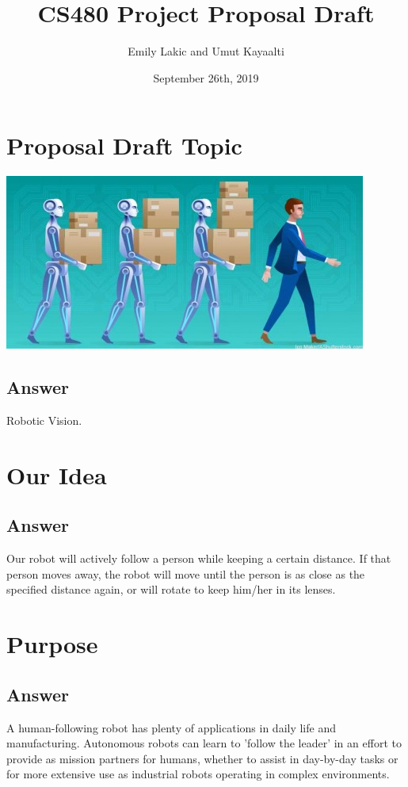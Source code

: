 \documentclass[
	12pt, %
]{fphw}
\title{CS480 Project Proposal Draft} %
\author{Emily Lakic and Umut Kayaalti} %
\date{September 26th, 2019} %
\institute{Binghamton University \\ Thomas J. Watson School of Engineering} %
\begin{document}
\maketitle %


\section*{Proposal Draft Topic}

\begin{center}
	\includegraphics[width=0.5\columnwidth]{robotsfollowhuman-450x218.jpg} %
\end{center}


\subsection*{Answer}

Robotic Vision.

\section*{Our Idea}

\subsection*{Answer}

Our robot will actively follow a person while keeping a certain distance. If that person moves away, the robot will move until the person is as close as the specified distance again, or will rotate to keep him/her in its lenses.

\section*{Purpose}

\subsection*{Answer} 

A human-following robot has plenty of applications in daily life and manufacturing. Autonomous robots can learn to 'follow the leader' in an effort to provide as mission partners for humans, whether to assist in day-by-day tasks or for more extensive use as industrial robots operating in complex environments.
\end{document}
